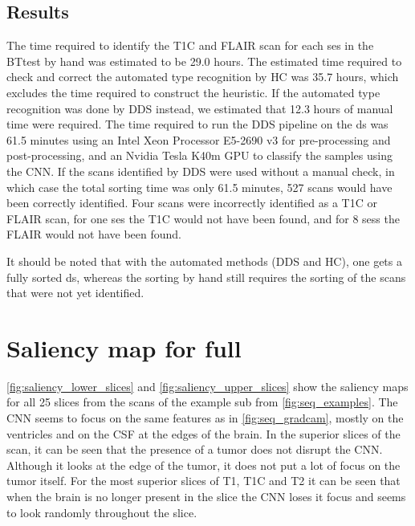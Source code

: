 \begin{subappendices}
\subsection{Results}
The time required to identify the \gls{T1C} and \gls{FLAIR} \gls{scan} for each \gls{ses} in the \gls{BTtest} by hand was estimated to be 29.0 hours.
The estimated time required to check and correct the automated \gls{type} recognition by \gls{HC} was 35.7 hours, which excludes the time required to construct the heuristic.
If the automated \gls{type} recognition was done by \gls{DDS} instead, we estimated that 12.3 hours of manual time were required.
The time required to run the \gls{DDS} pipeline on the \gls{ds} was 61.5 minutes using an Intel Xeon Processor E5-2690 v3 for pre-processing and post-processing, and an Nvidia Tesla K40m GPU to classify the \glspl{sample} using the \gls{CNN}.
If the \glspl{scan} identified by \gls{DDS} were used without a manual check, in which case the total sorting time was only 61.5 minutes, 527 \glspl{scan} would have been correctly identified.
Four \glspl{scan} were incorrectly identified as a \gls{T1C} or \gls{FLAIR} \gls{scan}, for one \gls{ses} the \gls{T1C} would not have been found, and for 8 \glspl{ses} the \gls{FLAIR} would not have been found.

It should be noted that with the automated methods (\gls{DDS} and \gls{HC}), one gets a fully sorted \gls{ds}, whereas the sorting by hand still requires the sorting of the \glspl{scan} that were not yet identified.

\clearpage

\section{Saliency map for full }
\label{app:saliency}

\cref{fig:saliency_lower_slices} and \cref{fig:saliency_upper_slices} show the saliency maps for all 25 \glspl{slice} from the \glspl{scan} of the example \gls{sub} from \cref{fig:seq_examples}.
The \gls{CNN} seems to focus on the same features as in \cref{fig:seq_gradcam}, mostly on the ventricles and on the \gls{CSF} at the edges of the brain.
In the superior \glspl{slice} of the \gls{scan}, it can be seen that the presence of a tumor does not disrupt the \gls{CNN}.
Although it looks at the edge of the tumor, it does not put a lot of focus on the tumor itself.
For the most superior \glspl{slice} of \gls{T1}, \gls{T1C} and \gls{T2} it can be seen that when the brain is no longer present in the \gls{slice} the \gls{CNN} loses it focus and seems to look randomly throughout the \gls{slice}.


\end{subappendices}
